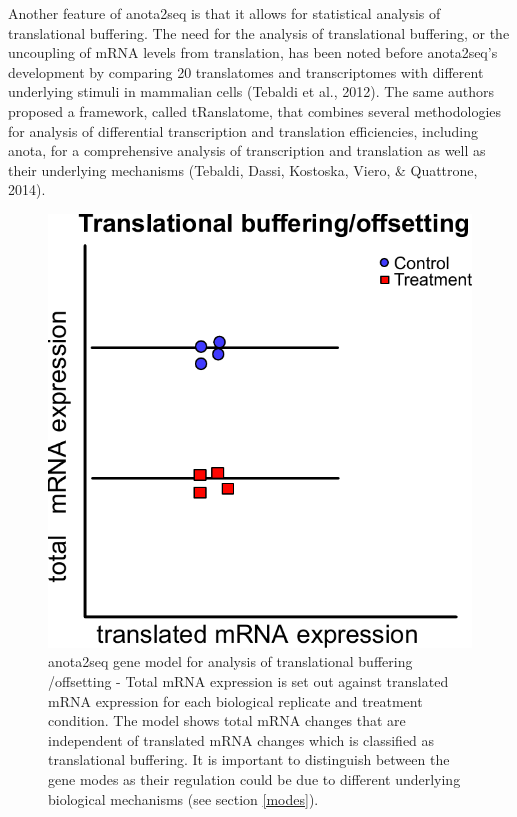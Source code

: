 \documentclass[12pt,openany]{book}
\begin{document}
Another feature of anota2seq is that it allows for statistical analysis
of translational buffering. The need for the analysis of translational
buffering, or the uncoupling of mRNA levels from translation, has been
noted before anota2seq's development by comparing 20 translatomes and
transcriptomes with different underlying stimuli in mammalian cells
(Tebaldi et al., 2012). The same authors proposed a framework, called
tRanslatome, that combines several methodologies for analysis of
differential transcription and translation efficiencies, including
anota, for a comprehensive analysis of transcription and translation as
well as their underlying mechanisms (Tebaldi, Dassi, Kostoska, Viero, \&
Quattrone, 2014).

\begin{figure}
  \includegraphics{./figures/geneModes_anota2seq.pdf}
  \caption{anota2seq gene model for analysis of translational buffering /offsetting - Total mRNA expression is set out against translated mRNA expression for each biological replicate and treatment condition. The model shows total mRNA changes that are independent of translated mRNA changes which is classified as translational buffering. It is important to distinguish between the gene modes as their regulation could be due to different underlying biological mechanisms (see section \ref{modes}).
  \label{fig:anota2seq}}
\end{figure}
\end{document}
